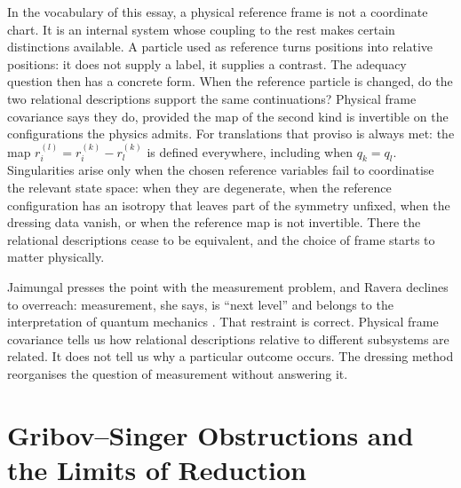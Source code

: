 \documentclass[11pt]{article}
\theoremstyle{plain}
\theoremstyle{definition}
\theoremstyle{remark}
\begin{document}
In the vocabulary of this essay, a physical reference frame is not a coordinate chart. It is an internal system whose coupling to the rest makes certain distinctions available. A particle used as reference turns positions into relative positions: it does not supply a label, it supplies a contrast. The adequacy question then has a concrete form. When the reference particle is changed, do the two relational descriptions support the same continuations? Physical frame covariance says they do, provided the map of the second kind is invertible on the configurations the physics admits. For translations that proviso is always met: the map $r_i^{(l)}=r_i^{(k)}-r_l^{(k)}$ is defined everywhere, including when $q_k=q_l$. Singularities arise only when the chosen reference variables fail to coordinatise the relevant state space: when they are degenerate, when the reference configuration has an isotropy that leaves part of the symmetry unfixed, when the dressing data vanish, or when the reference map is not invertible. There the relational descriptions cease to be equivalent, and the choice of frame starts to matter physically.

Jaimungal presses the point with the measurement problem, and Ravera declines to overreach: measurement, she says, is ``next level'' and belongs to the interpretation of quantum mechanics \cite{toe}. That restraint is correct. Physical frame covariance tells us how relational descriptions relative to different subsystems are related. It does not tell us why a particular outcome occurs. The dressing method reorganises the question of measurement without answering it.

\section{Gribov--Singer Obstructions and the Limits of Reduction}\label{sec:gribov}
\end{document}
